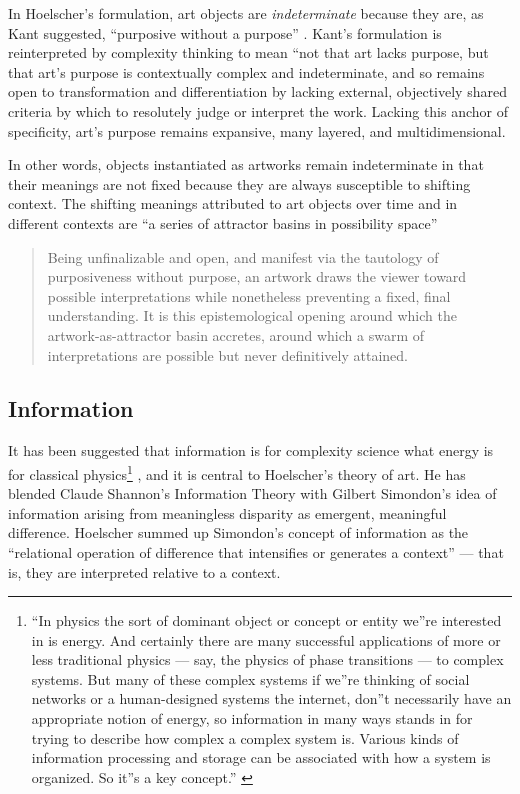 \documentclass[letterpaper]{article}
\begin{document}
    In Hoelscher's formulation, art objects are \emph{indeterminate} because they are, as Kant suggested, “purposive without a purpose” \citep[p.57]{KantCrtqOfJdgmnt}. Kant's formulation is reinterpreted by complexity thinking to mean “not that art lacks purpose, but that art's purpose is contextually complex and indeterminate, and so remains open to transformation and differentiation by lacking external, objectively shared criteria by which to resolutely judge or interpret the work. Lacking this anchor of specificity, art's purpose remains expansive, many layered, and multidimensional.\citep[p.25]{HoelscherThPtcsOfPhsSpc2014}

    In other words, objects instantiated as artworks remain indeterminate in that their meanings are not fixed because they are always susceptible to shifting context. The shifting meanings attributed to art objects over time and in different contexts are “a series of attractor basins in possibility space” \citep[p.4]{HoelscherThPtcsOfPhsSpc2014}
    
    \begin{quote}
        Being unfinalizable and open, and manifest via the tautology of purposiveness without purpose, an artwork draws the viewer toward possible interpretations while nonetheless preventing a fixed, final understanding. It is this epistemological opening around which the artwork-as-attractor basin accretes, around which a swarm of interpretations are possible but never definitively attained. \citep[p.12]{HoelscherThPtcsOfPhsSpc2014}
    \end{quote}

    \subsection{Information}

    It has been suggested that information is for complexity science what energy is for classical physics\footnote{
        “In physics the sort of dominant object or concept or entity we”re interested in is energy. And certainly there are many successful applications of more or less traditional physics — say, the physics of phase transitions — to complex systems. But many of these complex systems if we”re thinking of social networks or a human-designed systems the internet, don”t necessarily have an appropriate notion of energy, so information in many ways stands in for trying to describe how complex a complex system is. Various kinds of information processing and storage can be associated with how a system is organized.  So it”s a key concept.” \citep[0:52]{CrutchfieldIntrdctnToCmplxty2018}
    } \citep{CrutfieldRtAlSgntrsOfInfnty2015}, and it is central to Hoelscher's theory of art. He has blended Claude Shannon's Information Theory with Gilbert Simondon's idea of information arising from meaningless disparity as emergent, meaningful difference. Hoelscher summed up Simondon's concept of information as the “relational operation of difference that intensifies or generates a context” — that is, they are interpreted relative to a context. 
    
\end{document}
